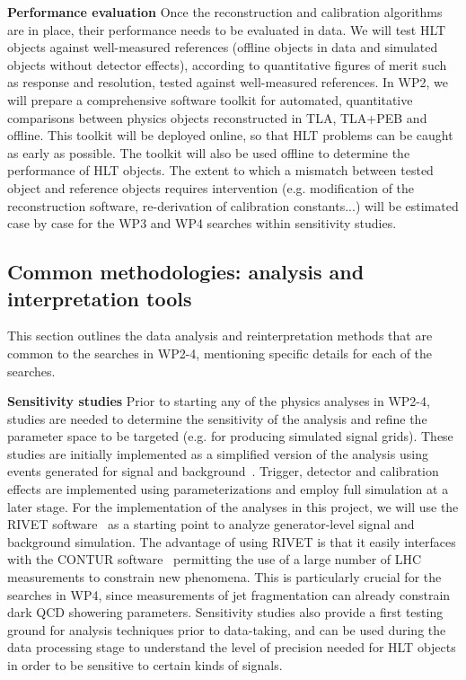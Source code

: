 \textbf{Performance evaluation} Once the reconstruction and calibration algorithms are in place, their performance needs to be evaluated in data.
We will test HLT objects against well-measured references (offline objects in data and simulated objects without detector effects), according to quantitative figures of merit such as response and resolution, tested against well-measured references. 
In WP2, we will prepare a comprehensive software toolkit for automated, quantitative comparisons between physics objects reconstructed in TLA, TLA+PEB and offline. 
This toolkit will be deployed online, so that HLT problems can be caught as early as possible.
The toolkit will also be used offline to determine the performance of HLT objects.  
The extent to which a mismatch between tested object and reference objects requires intervention (e.g. modification of the reconstruction software, re-derivation of calibration constants...) will be estimated case by case for the WP3 and WP4 searches within sensitivity studies. 
 
\subsection{Common methodologies: analysis and interpretation tools}
\label{sub:CommonMethodsAnalysisTools}

This section outlines the data analysis and reinterpretation methods that are common to the searches in WP2-4, mentioning specific details for each of the searches. 

\textbf{Sensitivity studies} Prior to starting any of the physics analyses in WP2-4, studies are needed to determine the sensitivity of the analysis and refine the parameter space to be targeted (e.g. for producing simulated signal grids). 
These studies are initially implemented as a simplified version of the analysis using events generated for signal and background~\cite{Alwall:2014hca,Sjostrand:2014zea}.   Trigger, detector and calibration effects are implemented using parameterizations and employ full simulation at a later stage. 
For the implementation of the analyses in this project, we will use the RIVET software~\cite{Buckley:2010ar}%
as a starting point to analyze generator-level signal and background simulation. 
The advantage of using RIVET is that it easily interfaces with the CONTUR software~\cite{Butterworth:2019wnt}%
permitting the use of a large number of LHC measurements to constrain new phenomena. 
This is particularly crucial for the searches in WP4, since measurements of jet fragmentation can already constrain dark QCD showering parameters. 
Sensitivity studies also provide a first testing ground for analysis techniques prior to data-taking, and can be used during the data processing stage 
to understand the level of precision needed for HLT objects in order to be sensitive to certain kinds of signals. 

